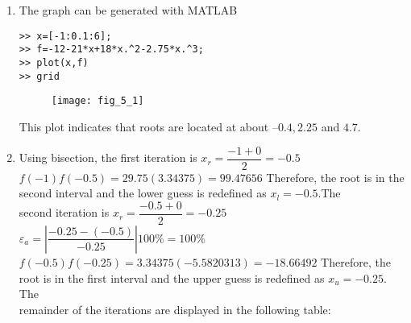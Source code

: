 \documentclass[../main.tex]{subfiles}
\begin{document}
\section{}
\begin{enumerate}[label=\bfseries(\alph*)]
\item The graph can be generated with MATLAB
\bigbreak
\begin{lstlisting}[numbers=none] 
>> x=[-1:0.1:6];
>> f=-12-21*x+18*x.^2-2.75*x.^3;
>> plot(x,f)
>> grid 
\end{lstlisting}
\bigbreak
\begin{figure}[H]
		\hspace*{1.8cm}\texttt{[image: fig\_5\_1]}
		\label{fig:fig_5_1}
	\end{figure}
\bigbreak
This plot indicates that roots are located at about –$0.4, 2.25$ and $4.7$.
\bigbreak
\item Using bisection, the first iteration is
\bigbreak
$x_{r}=\dfrac{-1+0}{2}=-0.5$
\bigbreak
$f(-1) f(-0.5)=29.75(3.34375)=99.47656$
\bigbreak
Therefore, the root is in the second interval and the lower guess is redefined as $x_{l}=-0.5$.The \\second iteration is
\bigbreak
$x_{r}=\dfrac{-0.5+0}{2}=-0.25$
\bigbreak
$\varepsilon_{a}=\left|\dfrac{-0.25-(-0.5)}{-0.25}\right| 100 \%=100 \%$
\bigbreak
$f(-0.5) f(-0.25)=3.34375(-5.5820313)=-18.66492$
\bigbreak
Therefore, the root is in the first interval and the upper guess is redefined as $x_{u}=-0.25$. The \\remainder of the iterations are displayed in the following table:
\bigbreak


\end{enumerate}
\end{document}

